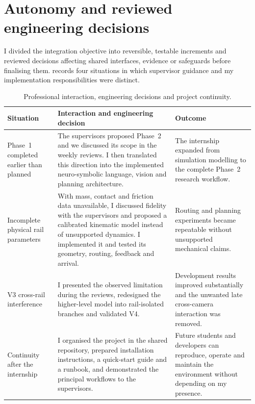 \section{Autonomy and reviewed engineering decisions}

I divided the integration objective into reversible, testable increments and
reviewed decisions affecting shared interfaces, evidence or safeguards before
finalising them.  records four situations in
which supervisor guidance and my implementation responsibilities were distinct.

\begin{table}[H]
\centering
\footnotesize
\renewcommand{\arraystretch}{0.98}
\caption{Professional interaction, engineering decisions and project continuity.}
\label{tab:professional-decisions}
\begin{tabularx}{\textwidth}{@{}
>{\raggedright\arraybackslash}p{}
>{\raggedright\arraybackslash}p{}
>{\raggedright\arraybackslash}X@{}}
\toprule
\textbf{Situation} & \textbf{Interaction and engineering decision} &
\textbf{Outcome}\\
\midrule
Phase~1 completed earlier than planned & The supervisors proposed Phase~2 and we
discussed its scope in the weekly reviews. I then translated this direction into
the implemented neuro-symbolic language, vision and planning architecture. & The
internship expanded from simulation modelling to the complete Phase~2 research
workflow.\\
\tablerowrule
Incomplete physical rail parameters & With mass, contact and friction data
unavailable, I discussed fidelity with the supervisors and proposed a calibrated
kinematic model instead of unsupported dynamics. I implemented it and tested
its geometry, routing, feedback and arrival. & Routing and planning experiments became
repeatable without unsupported mechanical claims.\\
\tablerowrule
V3 cross-rail interference & I presented the observed limitation during the
reviews, redesigned the higher-level model into rail-isolated branches and
validated V4. & Development results improved substantially and the unwanted
late cross-camera interaction was removed.\\
\tablerowrule
Continuity after the internship & I organised the project in the shared
repository, prepared installation instructions, a quick-start guide and a
runbook, and demonstrated the principal workflows to the supervisors. & Future
students and developers can reproduce, operate and maintain the environment
without depending on my presence.\\
\bottomrule
\end{tabularx}
\end{table}

